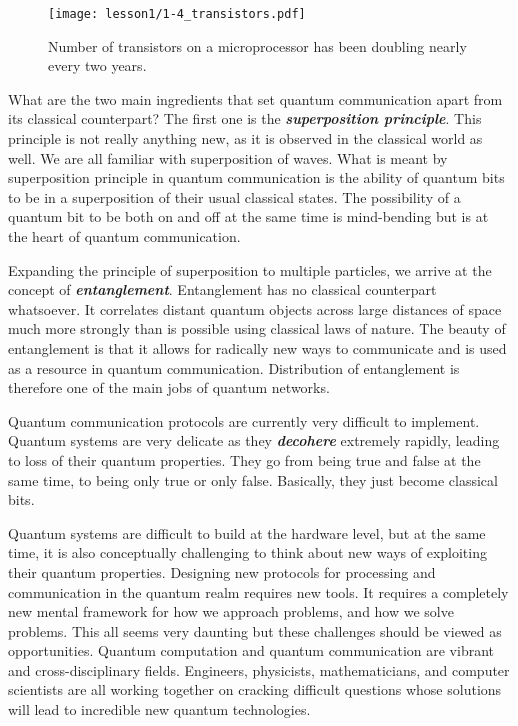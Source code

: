 \begin{figure}[t]
    \centering
    \texttt{[image: lesson1/1-4\_transistors.pdf]}
    \caption[Moore's law.]{Number of transistors on a microprocessor has been doubling nearly every two years.}
    \label{fig:1-4_transistors}
\end{figure}

What are the two main ingredients that set quantum communication apart from its classical counterpart?
The first one is the \textit{\textbf{superposition principle}}.
This principle is not really anything new, as it is observed in the classical world as well.
We are all familiar with superposition of waves.
What is meant by superposition principle in quantum communication is the ability of quantum bits to be in a superposition of their usual classical states.
The possibility of a quantum bit to be both on and off at the same time is mind-bending but is at the heart of quantum communication.

Expanding the principle of superposition to multiple particles, we arrive at the concept of \textit{\textbf{entanglement}}.
Entanglement has no classical counterpart whatsoever.
It correlates distant quantum objects across large distances of space much more strongly than is possible using classical laws of nature.
The beauty of entanglement is that it allows for radically new ways to communicate and is used as a resource in quantum communication.
Distribution of entanglement is therefore one of the main jobs of quantum networks.

Quantum communication protocols are currently very difficult to implement.
Quantum systems are very delicate as they \textit{\textbf{decohere}} extremely rapidly, leading to loss of their quantum properties.
They go from being true and false at the same time, to being only true or only false.
Basically, they just become classical bits.

Quantum systems are difficult to build at the hardware level, but at the same time, it is also conceptually challenging to think about new ways of exploiting their quantum properties.
Designing new protocols for processing and communication in the quantum realm requires new tools.
It requires a completely new mental framework for how we approach problems, and how we solve problems.
This all seems very daunting but these challenges should be viewed as opportunities.
Quantum computation and quantum communication are vibrant and cross-disciplinary fields.
Engineers, physicists, mathematicians, and computer scientists are all working together on cracking difficult questions whose solutions will lead to incredible new quantum technologies.

